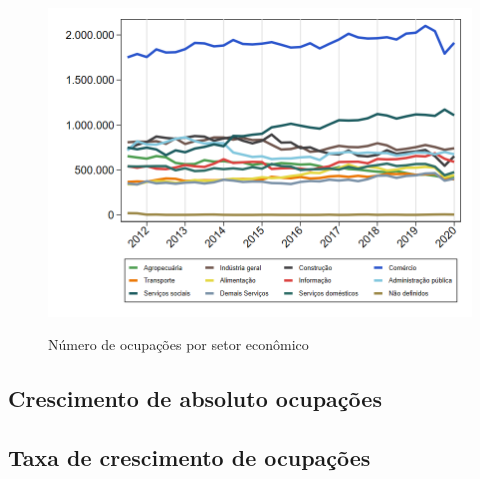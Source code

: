 \documentclass[10pt]{beamer}
\begin{document}
\begin{frame}
\textit{\hyperlink{indice_principal_amz_urbana}{}}
\begin{figure}
  \centering
  \includegraphics[width=.85\linewidth]{./../analysis/output/_amz_urbana_importancia_relativa.png}
  \label{_amz_urbana_importancia_relativa}
  \caption{{Número de ocupações por setor econômico}}
\end{figure}
\end{frame}

\subsection{Crescimento de absoluto ocupações}

\begin{frame}
\textit{\hyperlink{indice_principal_amz_urbana}{}}

\end{frame}


\begin{frame}
\textit{\hyperlink{indice_principal_amz_urbana}{}}

\end{frame}


\begin{frame}
\textit{\hyperlink{indice_principal_amz_urbana}{}}

\end{frame}

\subsection{Taxa de crescimento de ocupações}
\end{document}
